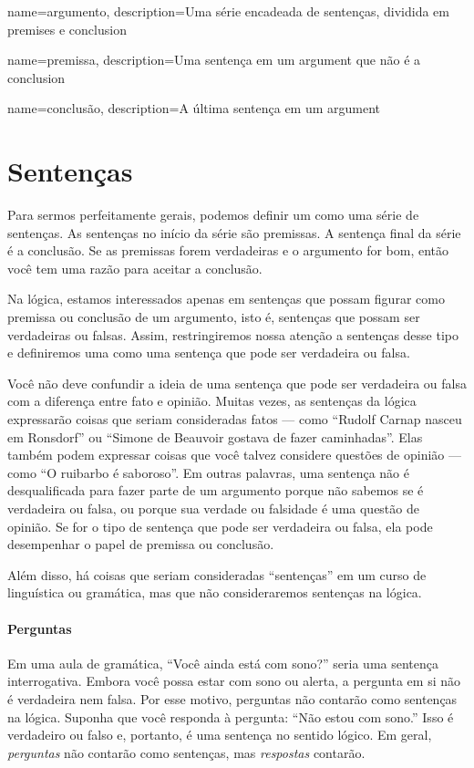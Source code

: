 {
name=argumento,
description={Uma série encadeada de sentenças, dividida em \gls{premise}s e \gls{conclusion}}
}

{
name=premissa,
description={Uma sentença em um \gls{argument} que não é a \gls{conclusion}}
}

{
name=conclusão,
description={A última sentença em um \gls{argument}}
}


\section{Sentenças}
\label{intro.sentences}

Para sermos perfeitamente gerais, podemos definir um  como uma série de sentenças. As sentenças no início da série são premissas. A sentença final da série é a conclusão. Se as premissas forem verdadeiras e o argumento for bom, então você tem uma razão para aceitar a conclusão.

Na lógica, estamos interessados apenas em sentenças que possam figurar como premissa ou conclusão de um argumento, isto é, sentenças que possam ser verdadeiras ou falsas. Assim, restringiremos nossa atenção a sentenças desse tipo e definiremos uma  como uma sentença que pode ser verdadeira ou falsa.

Você não deve confundir a ideia de uma sentença que pode ser verdadeira ou falsa com a diferença entre fato e opinião. Muitas vezes, as sentenças da lógica expressarão coisas que seriam consideradas fatos — como \textquotedblleft Rudolf Carnap nasceu em Ronsdorf\textquotedblright{} ou \textquotedblleft Simone de Beauvoir gostava de fazer caminhadas\textquotedblright{}. Elas também podem expressar coisas que você talvez considere questões de opinião — como \textquotedblleft O ruibarbo é saboroso\textquotedblright{}. Em outras palavras, uma sentença não é desqualificada para fazer parte de um argumento porque não sabemos se é verdadeira ou falsa, ou porque sua verdade ou falsidade é uma questão de opinião. Se for o tipo de sentença que pode ser verdadeira ou falsa, ela pode desempenhar o papel de premissa ou conclusão.

Além disso, há coisas que seriam consideradas \textquotedblleft sentenças\textquotedblright{} em um curso de linguística ou gramática, mas que não consideraremos sentenças na lógica.

\paragraph{Perguntas} Em uma aula de gramática, \textquotedblleft Você ainda está com sono?\textquotedblright{} seria uma sentença interrogativa. Embora você possa estar com sono ou alerta, a pergunta em si não é verdadeira nem falsa. Por esse motivo, perguntas não contarão como sentenças na lógica. Suponha que você responda à pergunta: \textquotedblleft Não estou com sono.\textquotedblright{} Isso é verdadeiro ou falso e, portanto, é uma sentença no sentido lógico. Em geral, \emph{perguntas} não contarão como sentenças, mas \emph{respostas} contarão.

